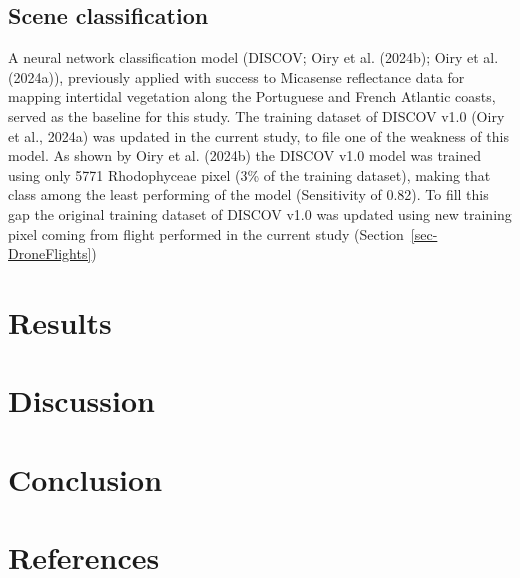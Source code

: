 \documentclass[
  letterpaper,
  DIV=11,
  numbers=noendperiod]{scrartcl}
\begin{document}
\subsection{Scene classification}\label{scene-classification}

A neural network classification model (DISCOV; Oiry et al. (2024b); Oiry
et al. (2024a)), previously applied with success to Micasense
reflectance data for mapping intertidal vegetation along the Portuguese
and French Atlantic coasts, served as the baseline for this study. The
training dataset of DISCOV v1.0 (Oiry et al., 2024a) was updated in the
current study, to file one of the weakness of this model. As shown by
Oiry et al. (2024b) the DISCOV v1.0 model was trained using only 5771
Rhodophyceae pixel (3\% of the training dataset), making that class
among the least performing of the model (Sensitivity of 0.82). To fill
this gap the original training dataset of DISCOV v1.0 was updated using
new training pixel coming from flight performed in the current study
(Section~\ref{sec-DroneFlights})

\section{Results}\label{results}

\section{Discussion}\label{discussion}

\section{Conclusion}\label{conclusion}

\section*{References}\label{references}
\end{document}
